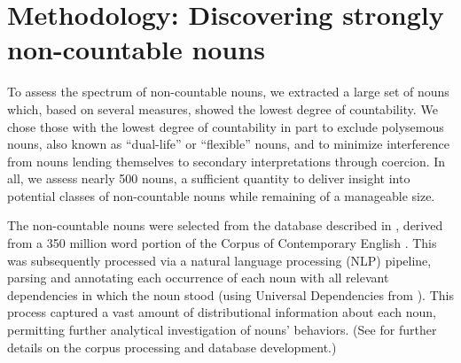 \documentclass[output=paper]{langscibook}
\begin{document}
\section{Methodology: Discovering strongly non-countable nouns}\label{gri-ric:sec:varieties} 


To assess the spectrum of non-countable nouns, we extracted a large set of nouns which, based on several measures, showed the lowest degree of countability. We chose those with the lowest degree of countability in part to exclude polysemous nouns, also known as ``dual-life''  or ``flexible'' nouns, and to  minimize interference from nouns lending themselves to secondary interpretations through coercion.  In all, we assess nearly 500 nouns, a  sufficient quantity to deliver insight into potential  classes of non-countable nouns while remaining of  a manageable size.

The non-countable nouns were selected from the database described in \citet{GrimmWahlang2020}, derived from a 350 million word portion of the Corpus of Contemporary English \citep{davies2009}.  This was subsequently processed via a natural language processing (NLP) pipeline, parsing and annotating each occurrence of each noun with all relevant dependencies in which the noun stood (using Universal Dependencies from \citealt{de-marneffe-etal2014}).  This process captured a vast amount of distributional information about each noun, permitting further analytical investigation of nouns' behaviors.  (See \citealt{GrimmWahlang2020} for further details on the corpus processing and database development.)
\end{document}
